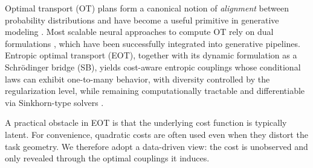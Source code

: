 \documentclass[11pt]{article}
\theoremstyle{definition}
\numberwithin{equation}{section}%
\begin{document}
Optimal transport (OT) plans form a canonical notion of \textit{alignment} between probability distributions and have become a useful primitive in generative modeling \citep{villani2021topics,peyre2019computational}.
Most scalable neural approaches to compute OT rely on dual formulations \citep{peyre2019computational}, which have been successfully integrated into generative pipelines.
Entropic optimal transport (EOT), together with its dynamic formulation as a Schr\"odinger bridge (SB), yields cost-aware entropic couplings whose conditional laws can exhibit one-to-many behavior, with diversity controlled by the regularization level, while remaining computationally tractable and differentiable via Sinkhorn-type solvers \citep{cuturi2013sinkhorn,conforti2019second}.

A practical obstacle in EOT is that the underlying cost function is typically latent.
For convenience, quadratic costs are often used even when they distort the task geometry.
We therefore adopt a data-driven view: the cost is unobserved and only revealed through the optimal couplings it induces.

\end{document}
